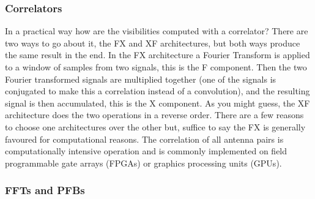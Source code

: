 \documentclass[usenatbib,usegraphicx]{article}
\begin{document}
\subsubsection{Correlators}

In a practical way how are the visibilities computed with a correlator?
There are two ways to go about it, the FX and XF architectures, but both ways produce the same result in the end.
In the FX architecture a Fourier Transform is applied to a window of samples from two signals, this is the F component.
Then the two Fourier transformed signals are multiplied together (one of the signals is conjugated to make this a correlation instead of a convolution), and the resulting signal is then accumulated, this is the X component.
As you might guess, the XF architecture does the two operations in a reverse order.
There are a few reasons to choose one architectures over the other but, suffice to say the FX is generally favoured for computational reasons.
The correlation of all antenna pairs is computationally intensive operation and is commonly implemented on field programmable gate arrays (FPGAs) or graphics processing units (GPUs).

\subsubsection{FFTs and PFBs}
\end{document}
